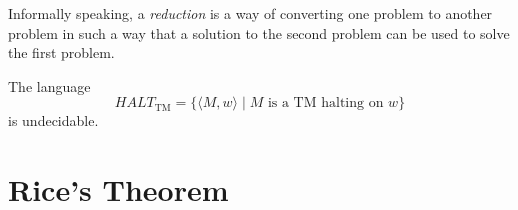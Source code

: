 Informally speaking, a \textit{reduction} is a way of converting one problem to another problem in such a way that a solution to the second problem can be used to solve the first problem.

\begin{theorem}
    The language 
    \begin{equation*}
        HALT_\text{TM} = \{\langle M, w\rangle\mid\text{$M$ is a TM halting on $w$}\}
    \end{equation*}
    is undecidable.
\end{theorem}

\section{Rice's Theorem}
\begin{theorem}[Rice]
    
\end{theorem}
